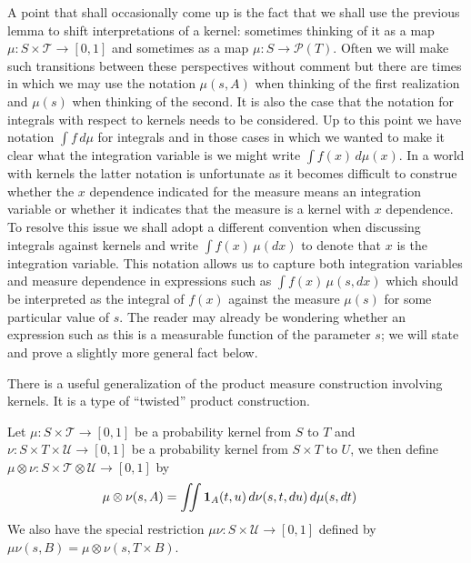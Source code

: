 A point that shall occasionally come up is the fact that we shall use
the previous lemma to shift interpretations of a kernel: sometimes
thinking of it as a map $\mu : S \times \mathcal{T} \to [0,1]$ and
sometimes as a map $\mu : S \to \mathcal{P}(T)$.  Often we will make
such transitions between these perspectives without  comment but there
are times in which we may use the notation $\mu(s,A)$ when thinking of
the first realization and $\mu(s)$ when thinking of the second.  It is
also the case that the notation for integrals with respect to kernels
needs to be considered.  Up to this point we have notation $\int f \,
d\mu$ for integrals and in those cases in which we wanted to make it
clear what the integration variable is we might write $\int f(x) \,
d\mu(x)$.  In a world with kernels the latter notation is unfortunate
as it becomes difficult to construe whether the $x$ dependence indicated
for the measure means an integration variable or whether it
indicates that the measure is a kernel with $x$ dependence.  To resolve
this issue we shall adopt a different convention when discussing
integrals against kernels and write $\int f(x) \, \mu(dx)$ to denote
that $x$ is the integration variable.  This notation allows us to
capture both integration variables and measure dependence in
expressions such as $\int f(x) \, \mu(s, dx)$ which should be
interpreted as the integral of $f(x)$ against the measure $\mu(s)$ for
some particular value of $s$.  The reader may already be wondering
whether an expression such as this is a measurable function of the
parameter $s$; we will state and prove a slightly more general
fact below.

There is a useful generalization of the product measure construction
involving kernels.  It is a type of ``twisted'' product construction.
\begin{defn}Let $\mu : S \times \mathcal{T} \to [0,1]$ be a
  probability kernel from $S$ to $T$ and $\nu : S \times T \times
  \mathcal{U} \to [0,1]$ be a probability kernel from $S \times T$ to
  $U$, we then define $\mu \otimes \nu : S \times \mathcal{T} \otimes
  \mathcal{U} \to [0,1]$ by
\begin{align*}
\mu \otimes \nu(s, A) &= \iint \textbf{1}_{A}(t,u) \,
d\nu(s,t,du) \, d\mu(s, dt)
\end{align*}
We also have the special restriction $\mu \nu : S \times 
  \mathcal{U} \to [0,1]$ defined by $\mu \nu(s, B) = \mu \otimes
  \nu(s, T \times B)$.
\end{defn}

